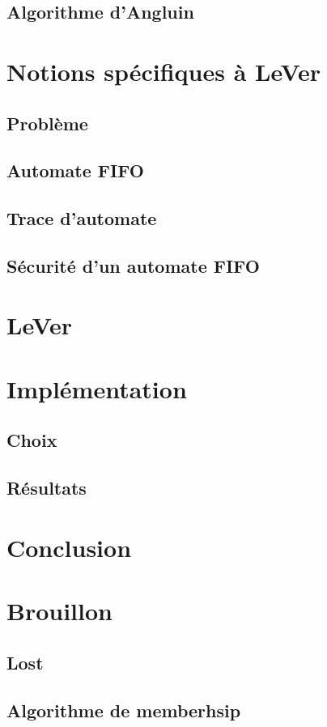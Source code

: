 	\section{Algorithme d'Angluin}\label{sec:angluin}

	\chapter{Notions spécifiques à LeVer}\label{ch:specific}
	\section{Problème}\label{sec:prob}%
	\section{Automate FIFO}\label{sec:fifo}
	\section{Trace d'automate}\label{sec:trace}%
	\section{Sécurité d'un automate FIFO}\label{sec:unsafe}%

	\chapter{LeVer}\label{ch:lever}




	\chapter{Implémentation}\label{ch:impl}
	\section{Choix}\label{sec:choix}
	\section{Résultats}\label{sec:res}

	\chapter{Conclusion}\label{ch:ccl}

	\chapter{Brouillon}
	\section{Lost}
	\section{Algorithme de memberhsip}

	\newpage
	
	


